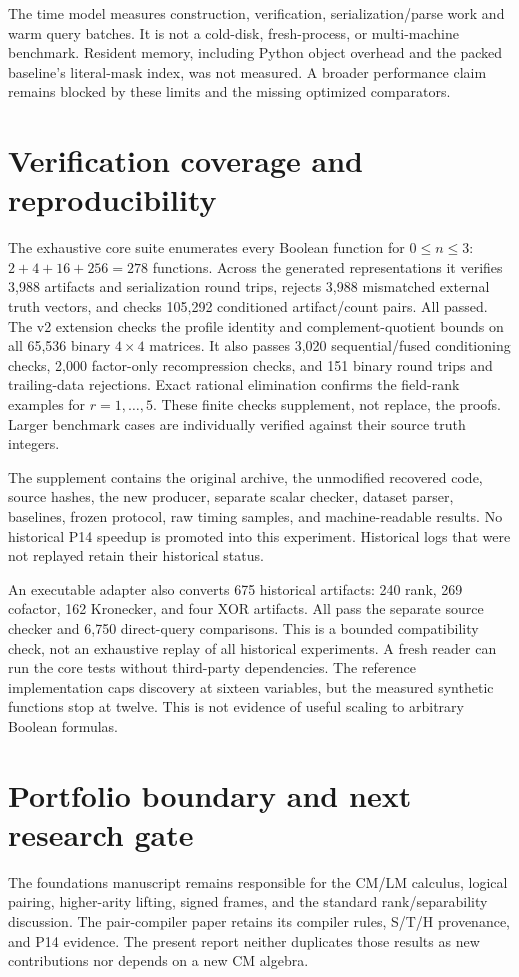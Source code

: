 \documentclass[11pt]{article}
\theoremstyle{definition}\newtheorem{definition}[theorem]{Definition}
\theoremstyle{remark}\newtheorem{remark}[theorem]{Remark}
\begin{document}
The time model measures construction, verification, serialization/parse work and warm query batches. It is not a cold-disk, fresh-process, or multi-machine benchmark. Resident memory, including Python object overhead and the packed baseline's literal-mask index, was not measured. A broader performance claim remains blocked by these limits and the missing optimized comparators.

\section{Verification coverage and reproducibility}
The exhaustive core suite enumerates every Boolean function for $0\le n\le3$: $2+4+16+256=278$ functions. Across the generated representations it verifies 3,988 artifacts and serialization round trips, rejects 3,988 mismatched external truth vectors, and checks 105,292 conditioned artifact/count pairs. All passed. The v2 extension checks the profile identity and complement-quotient bounds on all 65,536 binary $4\times4$ matrices. It also passes 3,020 sequential/fused conditioning checks, 2,000 factor-only recompression checks, and 151 binary round trips and trailing-data rejections. Exact rational elimination confirms the field-rank examples for $r=1,\ldots,5$. These finite checks supplement, not replace, the proofs. Larger benchmark cases are individually verified against their source truth integers.

The supplement contains the original archive, the unmodified recovered code, source hashes, the new producer, separate scalar checker, dataset parser, baselines, frozen protocol, raw timing samples, and machine-readable results. No historical P14 speedup is promoted into this experiment. Historical logs that were not replayed retain their historical status.

An executable adapter also converts 675 historical artifacts: 240 rank, 269 cofactor, 162 Kronecker, and four XOR artifacts. All pass the separate source checker and 6,750 direct-query comparisons. This is a bounded compatibility check, not an exhaustive replay of all historical experiments. A fresh reader can run the core tests without third-party dependencies. The reference implementation caps discovery at sixteen variables, but the measured synthetic functions stop at twelve. This is not evidence of useful scaling to arbitrary Boolean formulas.

\section{Portfolio boundary and next research gate}
The foundations manuscript remains responsible for the CM/LM calculus, logical pairing, higher-arity lifting, signed frames, and the standard rank/separability discussion\cite{foundations}. The pair-compiler paper retains its compiler rules, S/T/H provenance, and P14 evidence. The present report neither duplicates those results as new contributions nor depends on a new CM algebra.
\end{document}
